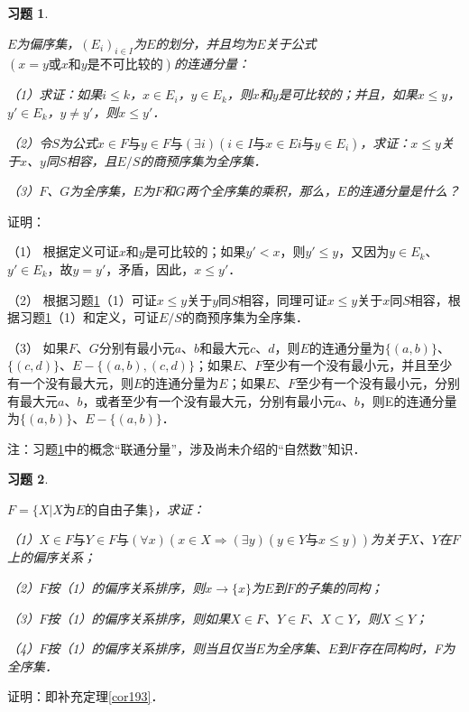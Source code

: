 \documentclass[12pt, a4paper, oneside]{book}
\newtheorem{exer}{习题}
\begin{document}
			\begin{exer}\label{exer80}
				\hfill\par
				$E$为偏序集，$(E_i)_{i\in I}$为$E$的划分，并且均为$E$关于公式$(x=y\text{或}x\text{和}y\text{是不可比较的})$的连通分量：
				\par
				（1）求证：如果$i\leq k$，$x\in E_i$，$y\in E_k$，则$x$和$y$是可比较的；并且，如果$x\leq y$，$y'\in E_k$，$y\neq y'$，则$x\leq y'$．
				\par
				（2）令$S$为公式$x\in F\text{与}y\in F\text{与}(\exists i)(i\in I\text{与}x\in Ei\text{与}y\in E_i)$，求证：$x\leq y$关于$x$、$y$同$S$相容，且$E/S$的商预序集为全序集．
				\par
				（3）$F$、$G$为全序集，$E$为$F$和$G$两个全序集的乘积，那么，$E$的连通分量是什么？
			\end{exer}
			证明：
			\par
			（1）	根据定义可证$x$和$y$是可比较的；如果$y'<x$，则$y'\leq y$，又因为$y\in E_k$、$y'\in E_k$，故$y=y'$，矛盾，因此，$x\leq y'$．
			\par
			（2）	根据习题\ref{exer80}（1）可证$x\leq y$关于$y$同$S$相容，同理可证$x\leq y$关于$x$同$S$相容，根据习题\ref{exer80}（1）和定义，可证$E/S$的商预序集为全序集．
			\par
			（3）	如果$F$、$G$分别有最小元$a$、$b$和最大元$c$、$d$，则$E$的连通分量为$\{(a,b)\}$、$\{(c, d)\}$、$E-\{(a, b), (c, d)\}$；如果$E$、$F$至少有一个没有最小元，并且至少有一个没有最大元，则$E$的连通分量为$E$；如果$E$、$F$至少有一个没有最小元，分别有最大元$a$、$b$，或者至少有一个没有最大元，分别有最小元$a$、$b$，则E的连通分量为$\{(a,b)\}$、$E-\{(a, b)\}$．
			\par
			注：习题\ref{exer80}中的概念“联通分量”，涉及尚未介绍的“自然数”知识．
			
			\begin{exer}\label{exer81}
				\hfill\par
				$F=\{X|X\text{为}E\text{的自由子集}\}$，求证：
				\par
				（1）$X\in F\text{与}Y\in F\text{与}(\forall x)(x\in X\Rightarrow (\exists y)(y\in Y\text{与}x\leq y))$为关于$X$、$Y$在$F$上的偏序关系；
				\par
				（2）$F$按（1）的偏序关系排序，则$x\to \{x\}$为$E$到$F$的子集的同构；
				\par
				（3）$F$按（1）的偏序关系排序，则如果$X\in F$、$Y\in F$、$X\subset Y$，则$X\leq Y$；
				\par
				（4）$F$按（1）的偏序关系排序，则当且仅当$E$为全序集、$E$到$F$存在同构时，F为全序集．
			\end{exer}
			证明：即补充定理\ref{cor193}．
			
\end{document}
